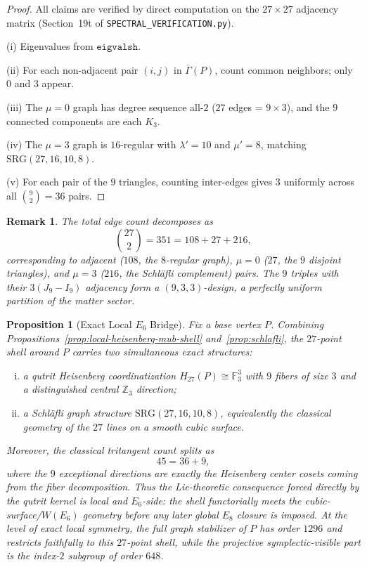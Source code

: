 \documentclass[12pt,a4paper]{article}
\newtheorem{proposition}[theorem]{Proposition}
\newtheorem{remark}[theorem]{Remark}
\begin{document}
\begin{proof}
All claims are verified by direct computation on the $27 \times 27$
adjacency matrix (Section~19t of
\texttt{SPECTRAL\_VERIFICATION.py}).

(i) Eigenvalues from $\texttt{eigvalsh}$.

(ii) For each non-adjacent pair $(i,j)$ in $\overline{\Gamma}(P)$,
count common neighbors; only $0$ and $3$ appear.

(iii) The $\mu = 0$ graph has degree sequence all-$2$
($27$ edges = $9 \times 3$), and the $9$ connected components
are each $K_3$.

(iv) The $\mu = 3$ graph is $16$-regular with
$\lambda' = 10$ and $\mu' = 8$, matching $\mathrm{SRG}(27,16,10,8)$.

(v) For each pair of the $9$ triangles, counting inter-edges
gives $3$ uniformly across all $\binom{9}{2} = 36$ pairs.
\end{proof}

\begin{remark}
The total edge count decomposes as
\[
  \binom{27}{2} = 351 = 108 + 27 + 216,
\]
corresponding to adjacent ($108$, the $8$-regular graph),
$\mu = 0$ ($27$, the $9$ disjoint triangles), and
$\mu = 3$ ($216$, the Schl\"afli complement) pairs.
The $9$ triples with their $3(J_9 - I_9)$ adjacency form a
$(9,3,3)$-design, a perfectly uniform partition of the matter sector.
\end{remark}

\begin{proposition}[Exact Local $E_6$ Bridge]
\label{prop:local-e6-bridge}
Fix a base vertex $P$. Combining
Propositions~\ref{prop:local-heisenberg-mub-shell}
and~\ref{prop:schlafli}, the $27$-point shell around $P$ carries two
simultaneous exact structures:
\begin{enumerate}[(i)]
  \item a qutrit Heisenberg coordinatization
        $H_{27}(P) \cong \mathbb{F}_3^3$ with $9$ fibers of size $3$ and a
        distinguished central $\mathbb{Z}_3$ direction;
  \item a Schl\"afli graph structure $\mathrm{SRG}(27,16,10,8)$,
        equivalently the classical geometry of the $27$ lines on a smooth
        cubic surface.
\end{enumerate}
Moreover, the classical tritangent count splits as
\[
  45 = 36 + 9,
\]
where the $9$ exceptional directions are exactly the Heisenberg center cosets
coming from the fiber decomposition. Thus the Lie-theoretic consequence forced
directly by the qutrit kernel is local and $E_6$-side: the shell functorially
meets the cubic-surface/$W(E_6)$ geometry before any later global $E_8$
closure is imposed.
At the level of exact local symmetry, the full graph stabilizer of $P$ has order
$1296$ and restricts faithfully to this $27$-point shell, while the projective
symplectic-visible part is the index-$2$ subgroup of order $648$.
\end{proposition}
\end{document}
